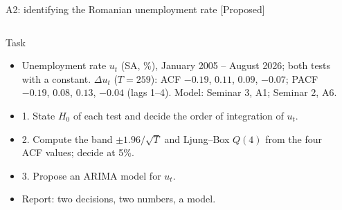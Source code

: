 \begin{frame}{A2: identifying the Romanian unemployment rate [Proposed]}
\propsub
\itemsize{\scriptsize}
\begin{columns}[T]
\begin{column}{\taskw}
\begin{block}{Task}
\begin{center}
\scriptsize
{}
\end{center}
\begin{itemize}
    \item Unemployment rate $u_t$ (SA, \%), January 2005 -- August 2026; both tests with a constant. $\Delta u_t$ ($T = 259$): ACF $\ensuremath{-}0.19$, $0.11$, $0.09$, $\ensuremath{-}0.07$; PACF $\ensuremath{-}0.19$, $0.08$, $0.13$, $\ensuremath{-}0.04$ (lags 1--4). Model: Seminar 3, A1; Seminar 2, A6.
    \item 1. State $H_0$ of each test and decide the order of integration of $u_t$.
    \item 2. Compute the band $\pm 1.96/\sqrt{T}$ and Ljung--Box $Q(4)$ from the four ACF values; decide at 5\%.
    \item 3. Propose an ARIMA model for $u_t$.
    \item Report: two decisions, two numbers, a model.
\end{itemize}
\end{block}
\end{column}
\begin{column}{\solw}
\end{column}
\end{columns}
\end{frame}

